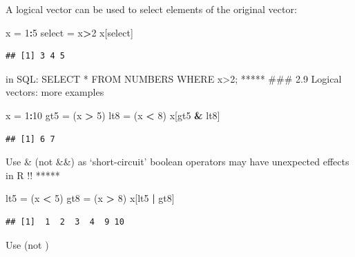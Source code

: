\documentclass[
  ignorenonframetext,
]{beamer}
\newenvironment{Shaded}{\begin{snugshade}}{\end{snugshade}}
\newcommand{\DecValTok}[1]{\textcolor[rgb]{0.00,0.00,0.81}{#1}}
\newcommand{\NormalTok}[1]{#1}
\newcommand{\OtherTok}[1]{\textcolor[rgb]{0.56,0.35,0.01}{#1}}
\newcommand{\SpecialCharTok}[1]{\textcolor[rgb]{0.81,0.36,0.00}{\textbf{#1}}}
\begin{document}
\begin{frame}[fragile]
A logical vector can be used to select elements of the original vector:

\begin{Shaded}
\begin{Highlighting}[]
\NormalTok{x }\OtherTok{=} \DecValTok{1}\SpecialCharTok{:}\DecValTok{5}
\NormalTok{select }\OtherTok{=}\NormalTok{ x}\SpecialCharTok{\textgreater{}}\DecValTok{2}
\NormalTok{x[select]}
\end{Highlighting}
\end{Shaded}

\begin{verbatim}
## [1] 3 4 5
\end{verbatim}

in SQL: SELECT * FROM NUMBERS WHERE x\textgreater2; ***** \#\#\# 2.9
Logical vectors: more examples

\begin{Shaded}
\begin{Highlighting}[]
\NormalTok{x }\OtherTok{=} \DecValTok{1}\SpecialCharTok{:}\DecValTok{10}
\NormalTok{gt5 }\OtherTok{=}\NormalTok{ (x }\SpecialCharTok{\textgreater{}} \DecValTok{5}\NormalTok{)}
\NormalTok{lt8 }\OtherTok{=}\NormalTok{ (x }\SpecialCharTok{\textless{}} \DecValTok{8}\NormalTok{)}
\NormalTok{x[gt5 }\SpecialCharTok{\&}\NormalTok{ lt8]}
\end{Highlighting}
\end{Shaded}

\begin{verbatim}
## [1] 6 7
\end{verbatim}

Use \& (not \&\&) as `short-circuit' boolean operators may have
unexpected effects in R !! *****

\begin{Shaded}
\begin{Highlighting}[]
\NormalTok{lt5 }\OtherTok{=}\NormalTok{ (x }\SpecialCharTok{\textless{}} \DecValTok{5}\NormalTok{)}
\NormalTok{gt8 }\OtherTok{=}\NormalTok{ (x }\SpecialCharTok{\textgreater{}} \DecValTok{8}\NormalTok{)}
\NormalTok{x[lt5 }\SpecialCharTok{|}\NormalTok{ gt8]}
\end{Highlighting}
\end{Shaded}

\begin{verbatim}
## [1]  1  2  3  4  9 10
\end{verbatim}

Use \textbar{} (not \textbar\textbar)
\end{frame}
\end{document}
